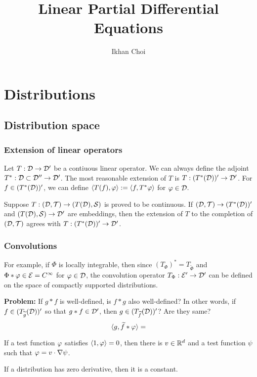 \documentclass{../note}
\begin{document}
\title{Linear Partial Differential Equations}
\author{Ikhan Choi}
\maketitle
\tableofcontents


\part{Distributions}
\chapter{Distribution space}


\section{Extension of linear operators}
Let $T:\mathcal{D}\to\mathcal{D}'$ be a contiuous linear operator.
We can always define the adjoint $T^*:\mathcal{D}\subset\mathcal{D}''\to\mathcal{D}'$.
The most reasonable extension of $T$ is $T:(T^*(\mathcal{D}))'\to\mathcal{D}'$.
For $f\in(T^*(\mathcal{D}))'$, we can define $\langle T(f),\varphi\rangle:=\langle f,T^*\varphi\rangle$ for $\varphi\in\mathcal{D}$.

Suppose $T:(\mathcal{D},\mathcal{T})\to(T(\mathcal{D}),\mathcal{S})$ is proved to be continuous.
If $(\mathcal{D},\mathcal{T})\to(T^*(\mathcal{D}))'$ and $(T(\mathcal{D}),\mathcal{S})\to\mathcal{D}'$ are embeddings, then the extension of $T$ to the completion of $(\mathcal{D},\mathcal{T})$ agrees with $T:(T^*(\mathcal{D}))'\to\mathcal{D}'$.

\section{Convolutions}
For example, if $\Phi$ is locally integrable, then since $(T_\Phi)^*=T_{\tilde\Phi}$ and $\Phi*\varphi\in\mathcal{E}=C^\infty$ for $\varphi\in\mathcal{D}$, the convolution operator $T_\Phi:\mathcal{E}'\to\mathcal{D}'$ can be defined on the space of compactly supported distributions.

\textbf{Problem:}
If $g*f$ is well-defined, is $f*g$ also well-defined?
In other words, if $f\in(T_{\widetilde g}(\mathcal{D}))'$ so that $g*f\in\mathcal{D}'$, then $g\in(T_{\widetilde f}(\mathcal{D}))'$? Are they same?
\[\langle g,\widetilde f*\varphi\rangle=\]


\begin{prb}
\begin{parts}
\item If a test function $\varphi$ satisfies $\langle1,\varphi\rangle=0$, then there is $v\in\mathbb{R}^d$ and a test function $\psi$ such that $\varphi=v\cdot\nabla\psi$.
\item If a distribution has zero derivative, then it is a constant.
\end{parts}
\end{prb}
\end{document}
